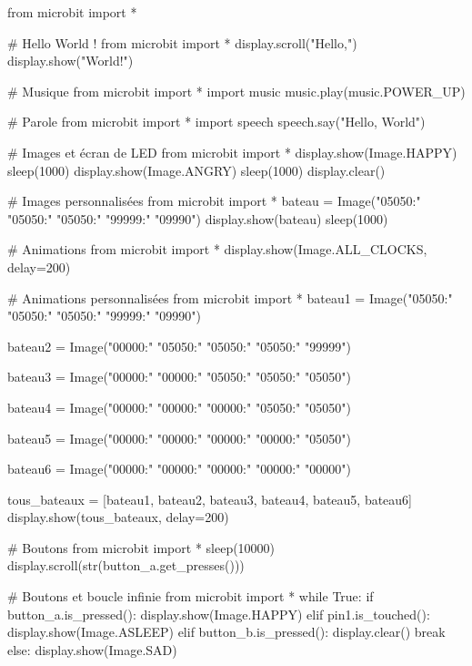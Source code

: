 from microbit import *

# Hello World !
from microbit import *
display.scroll("Hello,")
display.show("World!")


# Musique
from microbit import *
import music
music.play(music.POWER_UP)


# Parole
from microbit import *
import speech
speech.say("Hello, World")


# Images et écran de LED
from microbit import *
display.show(Image.HAPPY)
sleep(1000)
display.show(Image.ANGRY)
sleep(1000)
display.clear()


# Images personnalisées
from microbit import *
bateau = Image("05050:"
               "05050:"
               "05050:"
               "99999:"
               "09990")
display.show(bateau)
sleep(1000)


# Animations
from microbit import *
display.show(Image.ALL_CLOCKS, delay=200)


# Animations personnalisées
from microbit import *
bateau1 = Image("05050:"
                "05050:"
                "05050:"
                "99999:"
                "09990")

bateau2 = Image("00000:"
                "05050:"
                "05050:"
                "05050:"
                "99999")

bateau3 = Image("00000:"
                "00000:"
                "05050:"
                "05050:"
                "05050")

bateau4 = Image("00000:"
                "00000:"
                "00000:"
                "05050:"
                "05050")

bateau5 = Image("00000:"
                "00000:"
                "00000:"
                "00000:"
                "05050")

bateau6 = Image("00000:"
                "00000:"
                "00000:"
                "00000:"
                "00000")

tous_bateaux = [bateau1, bateau2, bateau3, bateau4, bateau5, bateau6]
display.show(tous_bateaux, delay=200)


# Boutons
from microbit import *
sleep(10000)
display.scroll(str(button_a.get_presses()))


# Boutons et boucle infinie
from microbit import *
while True:
    if button_a.is_pressed():
        display.show(Image.HAPPY)
    elif pin1.is_touched():
        display.show(Image.ASLEEP)
    elif button_b.is_pressed():
        display.clear()
        break
    else:
        display.show(Image.SAD)


